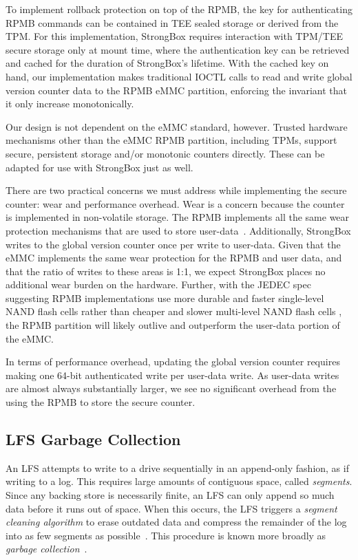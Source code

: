 To implement rollback protection on top of the RPMB, the key for
authenticating RPMB commands can be contained in TEE sealed storage or
derived from the TPM. For this implementation, StrongBox requires
interaction with TPM/TEE secure storage only at mount time, where the
authentication key can be retrieved and cached for the duration of
StrongBox's lifetime. With the cached key on hand, our implementation
makes traditional IOCTL calls to read and write global version counter
data to the RPMB eMMC partition, enforcing the invariant that it only
increase monotonically.

Our design is not dependent on the eMMC standard, however. Trusted
hardware mechanisms other than the eMMC RPMB partition, including
TPMs, support secure, persistent storage and/or monotonic counters
directly. These can be adapted for use with StrongBox just as well.

There are two practical concerns we must address while implementing
the secure counter: wear and performance overhead. Wear is a concern
because the counter is implemented in non-volatile storage. The RPMB
implements all the same wear protection mechanisms that are used to
store user-data~\cite{eMMC-standard}. Additionally, StrongBox writes
to the global version counter once per write to user-data. Given that
the eMMC implements the same wear protection for the RPMB and user
data, and that the ratio of writes to these areas is 1:1, we expect
StrongBox places no additional wear burden on the hardware. Further,
with the JEDEC spec suggesting RPMB implementations use more durable
and faster single-level NAND flash cells rather than cheaper and
slower multi-level NAND flash cells \cite{eMMC-standard,RPMB}, the
RPMB partition will likely outlive and outperform the user-data
portion of the eMMC.

In terms of performance overhead, updating the global version counter
requires making one 64-bit authenticated write per user-data write. As
user-data writes are almost always substantially larger, we see no
significant overhead from the using the RPMB to store the secure
counter.

\subsection{LFS Garbage Collection}

An LFS attempts to write to a drive sequentially in an append-only fashion, as
if writing to a log. This requires large amounts of contiguous space, called
\emph{segments}. Since any backing store is necessarily finite, an LFS can only
append so much data before it runs out of space. When this occurs, the LFS
triggers a \emph{segment cleaning algorithm} to erase outdated data and
compress the remainder of the log into as few segments as
possible~\cite{LFS,F2FS}. This procedure is known more broadly as \emph{garbage
collection}~\cite{F2FS}.

